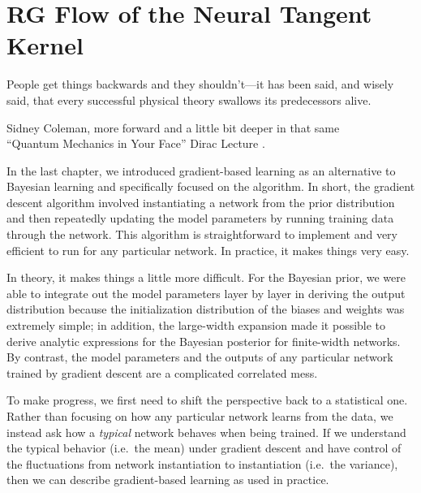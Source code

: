 
\chapter{RG Flow of the Neural Tangent Kernel}
\label{ch:NTKa}




\epigraph{People get things backwards and they shouldn't---it has been said, and wisely said, that every successful physical theory swallows its predecessors alive.}{Sidney Coleman,
more forward and a little bit deeper in that same \\
``Quantum Mechanics in Your Face'' Dirac Lecture  \cite{Coleman:2020put}.}











\noindent{}In the last chapter, we introduced gradient-based learning as an alternative to Bayesian learning and specifically focused on the  algorithm.
In short, the gradient descent algorithm involved instantiating a network from the prior distribution and then repeatedly updating the model parameters by running training data through the network. 
This algorithm is straightforward to implement and very efficient to run for any particular network.
In practice, it makes things very easy.

In theory, it makes things a little more difficult. %
For the Bayesian prior, we were able to integrate out the model parameters layer by layer in deriving the output distribution because the initialization distribution of the biases and weights was extremely simple; in addition,
the large-width expansion made 
it possible to derive analytic expressions for the Bayesian posterior for finite-width networks.
By contrast, the model parameters and the outputs of any particular
network trained by gradient descent are a complicated correlated mess.


To make progress, we first need to shift the perspective back to a statistical one. Rather than focusing on how any particular network learns from the data, we instead ask how a \emph{typical} network behaves when being trained. 
If we understand the typical behavior (i.e.~the mean) under gradient descent and have control of the fluctuations from network instantiation to instantiation (i.e.~the variance), then we can describe gradient-based learning as used in practice.

